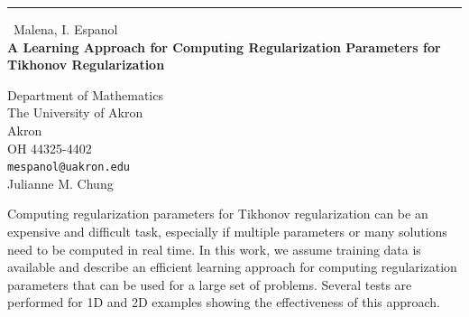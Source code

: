 \documentclass{report}
\begin{document}
\begin{center}
\rule{6in}{1pt} \
{\large Malena, I. Espanol \\
{\bf A Learning Approach for Computing Regularization Parameters for Tikhonov Regularization}}

Department of Mathematics \\ The University of Akron \\ Akron \\ OH 44325-4402
\\
{\tt mespanol@uakron.edu}\\
Julianne M. Chung\end{center}

Computing regularization parameters for Tikhonov regularization can be an
expensive and difficult task, especially if multiple parameters or many
solutions need to be computed in real time. In this work, we assume
training data is available and describe an efficient learning approach
for computing regularization parameters that can be used for a large set
of problems. Several tests are performed for 1D and 2D examples showing
the effectiveness of this approach.
\end{document}
